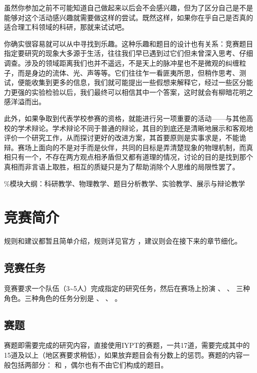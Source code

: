 \documentclass[a4paper,10pt,english]{sphinxmanual}
\begin{document}
虽然你参加之前不可能知道自己做起来以后会不会感兴趣，但为了区分自己是不是能够对这个活动感兴趣就需要做这样的尝试。既然这样，如果你在乎自己是否真的适合理工科领域的科研，那就来试试吧。

你确实很容易就可以从中寻找到乐趣。这种乐趣和题目的设计也有关系：竞赛题目指定要研究的现象大多源于生活，往往我们早已遇到过它们但未曾深入思考、仔细调查。涉及的领域距离我们也并不遥远，不是天上的脉冲星也不是微观的纠缠粒子，而是身边的流体、光、声等等。它们往往乍一看匪夷所思，但稍作思考、测试，便能收集到更多的信息，我们就可能提出一些假想来解释它，经过一些区分能力更强的实验检验以后，我们最终可以相信其中一个答案，这时就会有柳暗花明之感洋溢而出。

此外，如果争取到代表学校参赛的资格，就能进行另一项重要的活动——与其他高校的学术辩论。学术辩论不同于普通的辩论，其目的到底还是清晰地展示和客观地评价一个研究工作，从而探讨更好的改进方案，其首要原则是实事求是，不能诡辩。赛场上面向的不是对手而是伙伴，共同的目标是弄清楚现象的物理机制，而真相只有一个，不存在两方观点相矛盾但又都有道理的情况，讨论的目的是找到那个真相而非言语上取胜，相互的质疑只是为了帮助消除个人思维的局限性罢了。

\%模块大纲：科研教学、物理教学、题目分析教学、实验教学、展示与辩论教学


\chapter{竞赛简介}
\label{\detokenize{Introduction::doc}}\label{\detokenize{Introduction:id1}}
规则和建议都暂且简单介绍，规则详见官方  ，建议则会在接下来的章节细化。


\section{竞赛任务}
\label{\detokenize{Introduction:id2}}
竞赛要求一个队伍（3\textasciitilde{}5人）完成指定的研究任务，然后在赛场上扮演  、  、  三种角色。三种角色的任务分别是  、  、  。


\section{赛题}
\label{\detokenize{Introduction:id3}}
赛题即需要完成的研究内容，直接使用IYPT的赛题，一共17道，需要完成其中的15道及以上（地区赛要求稍低），如果放弃题目会有分数上的惩罚。赛题的内容一般包括两部分：  和  ，偶尔也有不由它们构成的题目。
\end{document}

